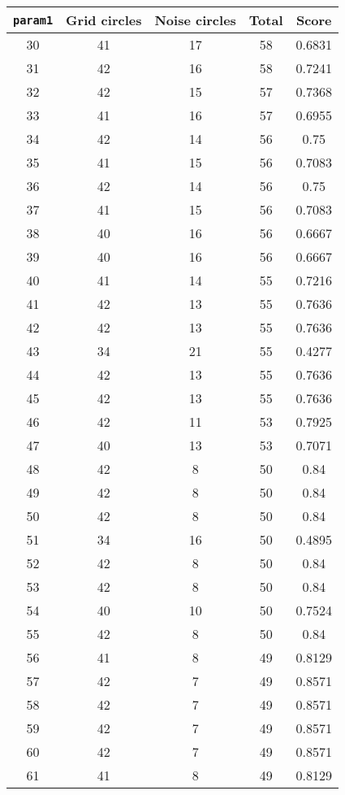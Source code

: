 \documentclass[letterpaper, 12pt]{article}
\begin{document}
\begin{longtable}{|c|c|c|c|c|}
\hline
\textbf{\texttt{param1}} & \textbf{Grid circles} & \textbf{Noise circles} & \textbf{Total} & \textbf{Score} \\
\hline
30 & 41 & 17 & 58 & 0.6831 \\
\hline
31 & 42 & 16 & 58 & 0.7241 \\
\hline
32 & 42 & 15 & 57 & 0.7368 \\
\hline
33 & 41 & 16 & 57 & 0.6955 \\
\hline
34 & 42 & 14 & 56 & 0.75 \\
\hline
35 & 41 & 15 & 56 & 0.7083 \\
\hline
36 & 42 & 14 & 56 & 0.75 \\
\hline
37 & 41 & 15 & 56 & 0.7083 \\
\hline
38 & 40 & 16 & 56 & 0.6667 \\
\hline
39 & 40 & 16 & 56 & 0.6667 \\
\hline
40 & 41 & 14 & 55 & 0.7216 \\
\hline
41 & 42 & 13 & 55 & 0.7636 \\
\hline
42 & 42 & 13 & 55 & 0.7636 \\
\hline
43 & 34 & 21 & 55 & 0.4277 \\
\hline
44 & 42 & 13 & 55 & 0.7636 \\
\hline
45 & 42 & 13 & 55 & 0.7636 \\
\hline
46 & 42 & 11 & 53 & 0.7925 \\
\hline
47 & 40 & 13 & 53 & 0.7071 \\
\hline
48 & 42 & 8 & 50 & 0.84 \\
\hline
49 & 42 & 8 & 50 & 0.84 \\
\hline
50 & 42 & 8 & 50 & 0.84 \\
\hline
51 & 34 & 16 & 50 & 0.4895 \\
\hline
52 & 42 & 8 & 50 & 0.84 \\
\hline
53 & 42 & 8 & 50 & 0.84 \\
\hline
54 & 40 & 10 & 50 & 0.7524 \\
\hline
55 & 42 & 8 & 50 & 0.84 \\
\hline
56 & 41 & 8 & 49 & 0.8129 \\
\hline
57 & 42 & 7 & 49 & 0.8571 \\
\hline
58 & 42 & 7 & 49 & 0.8571 \\
\hline
59 & 42 & 7 & 49 & 0.8571 \\
\hline
60 & 42 & 7 & 49 & 0.8571 \\
\hline
61 & 41 & 8 & 49 & 0.8129 \\

\end{longtable}
\end{document}
